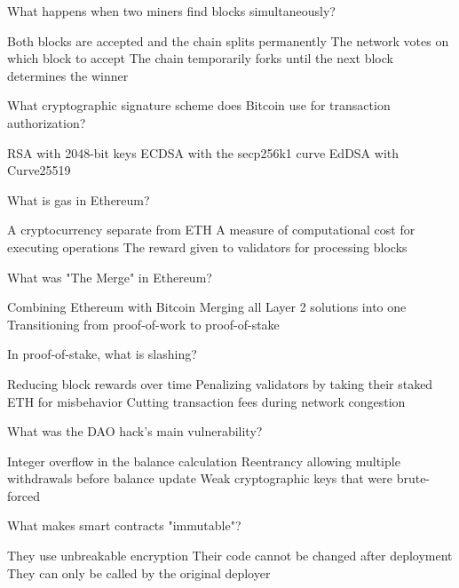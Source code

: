 \documentclass[10pt,a4paper,american]{exam}
\begin{document}
\begin{questions}
	\question What happens when two miners find blocks simultaneously?
	\begin{randomizechoices}
		\choice Both blocks are accepted and the chain splits permanently
		\choice The network votes on which block to accept
		\CorrectChoice The chain temporarily forks until the next block determines the winner
	\end{randomizechoices}

	\question What cryptographic signature scheme does Bitcoin use for transaction authorization?
	\begin{randomizechoices}
		\choice RSA with 2048-bit keys
		\CorrectChoice ECDSA with the secp256k1 curve
		\choice EdDSA with Curve25519
	\end{randomizechoices}

	\question What is gas in Ethereum?
	\begin{randomizechoices}
		\choice A cryptocurrency separate from ETH
		\CorrectChoice A measure of computational cost for executing operations
		\choice The reward given to validators for processing blocks
	\end{randomizechoices}

	\question What was "The Merge" in Ethereum?
	\begin{randomizechoices}
		\choice Combining Ethereum with Bitcoin
		\choice Merging all Layer 2 solutions into one
		\CorrectChoice Transitioning from proof-of-work to proof-of-stake
	\end{randomizechoices}

	\question In proof-of-stake, what is slashing?
	\begin{randomizechoices}
		\choice Reducing block rewards over time
		\CorrectChoice Penalizing validators by taking their staked ETH for misbehavior
		\choice Cutting transaction fees during network congestion
	\end{randomizechoices}

	\question What was the DAO hack's main vulnerability?
	\begin{randomizechoices}
		\choice Integer overflow in the balance calculation
		\CorrectChoice Reentrancy allowing multiple withdrawals before balance update
		\choice Weak cryptographic keys that were brute-forced
	\end{randomizechoices}

	\question What makes smart contracts "immutable"?
	\begin{randomizechoices}
		\choice They use unbreakable encryption
		\CorrectChoice Their code cannot be changed after deployment
		\choice They can only be called by the original deployer
	\end{randomizechoices}


\end{questions}
\end{document}
